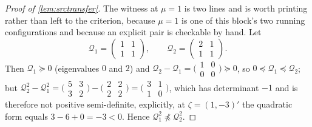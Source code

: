 \begin{proof}[Proof of \cref{lem:srctransfer}]
The witness at $\mu=1$ is two lines and is worth printing rather than left to the criterion,
because $\mu=1$ is one of this block's two running configurations and because an explicit pair is
checkable by hand. Let
\[
\mathcal Q_1=\begin{pmatrix}1&1\\1&1\end{pmatrix},
\qquad
\mathcal Q_2=\begin{pmatrix}2&1\\1&1\end{pmatrix} .
\]
Then $\mathcal Q_1\succeq0$ (eigenvalues $0$ and $2$) and
$\mathcal Q_2-\mathcal Q_1=\big(\begin{smallmatrix}1&0\\0&0\end{smallmatrix}\big)\succeq0$, so
$0\preceq\mathcal Q_1\preceq\mathcal Q_2$; but
$\mathcal Q_2^{2}-\mathcal Q_1^{2}=\big(\begin{smallmatrix}5&3\\3&2\end{smallmatrix}\big)-
\big(\begin{smallmatrix}2&2\\2&2\end{smallmatrix}\big)=\big(\begin{smallmatrix}3&1\\1&0\end{smallmatrix}\big)$,
which has determinant $-1$ and is therefore not positive semi-definite, explicitly, at
$\zeta=(1,-3)'$ the quadratic form equals $3-6+0=-3<0$. Hence
$\mathcal Q_1^{2}\not\preceq\mathcal Q_2^{2}$.


\end{proof}
